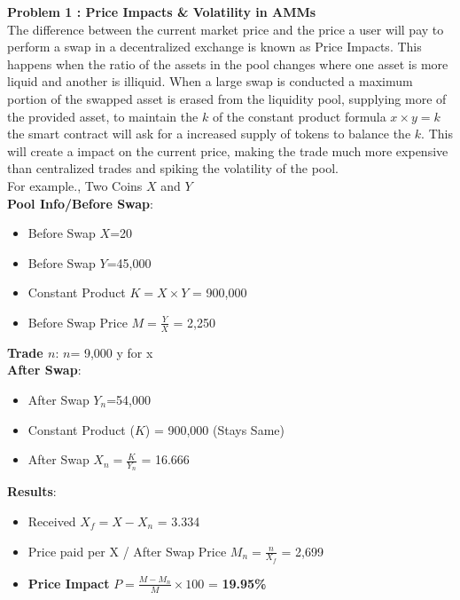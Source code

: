 \documentclass[letterpaper,11pt]{article}
\begin{document}
\textbf{Problem 1 : Price Impacts \& Volatility in AMMs}\\

The difference between the current market price and the price a user will pay to perform a swap in a decentralized exchange is known as Price Impacts. This happens when the ratio of the assets in the pool changes where one asset is more liquid and another is illiquid. When a large swap is conducted a maximum portion of the swapped asset is erased from the liquidity pool, supplying more of the provided asset, to maintain the $k$ of the constant product formula $x \times y=k$ the smart contract will ask for a increased supply of tokens to balance the $k$. This will create a impact on the current price, making the trade much more expensive than centralized trades and spiking the volatility of the pool.\\



For example., Two Coins $X$ and $Y$\\

\textbf{Pool Info/Before Swap}:
\begin{itemize}[wide, labelwidth=!, labelindent=0pt]
\item Before Swap $X$=20
\item Before Swap $Y$=45,000
\item Constant Product $K=X \times  Y$ = 900,000 
\item Before Swap Price $M=\frac{Y}{X}$ = 2,250 
\end{itemize}

\textbf{Trade $n$}: $n$= 9,000 y for x\\

\textbf{After Swap}:
\begin{itemize}[wide, labelwidth=!, labelindent=0pt]
\item After Swap $Y_n$=54,000 
\item Constant Product ($K$) = 900,000 (Stays Same)
\item After Swap $X_n=\frac{K}{Y_n}$ = 16.666  
\end{itemize}
\textbf{Results}:
\begin{itemize}[wide, labelwidth=!, labelindent=0pt]
\item Received $X_f={{X}-{X_n}}$ = 3.334 
\item Price paid per X / After Swap Price $M_n={\frac{n}{X_f}}$  = 2,699  
\item \textbf{Price Impact} $P={\frac{M - M_n}{M} \times  100}$ = \textbf{19.95\% }
\end{itemize}
\end{document}
